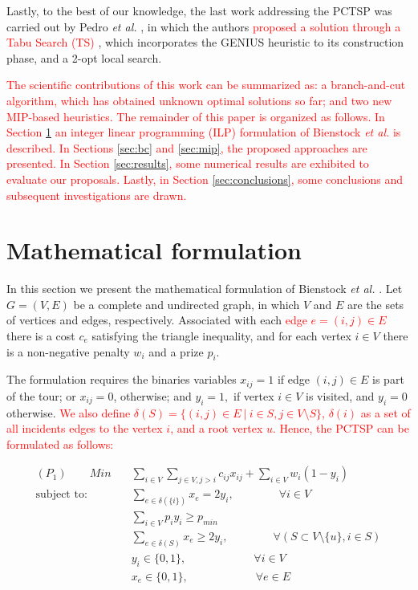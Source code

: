 \documentclass{ro}
\begin{document}
Lastly, to the best of our knowledge, the last work addressing the PCTSP was carried out by Pedro \textit{et al.} \cite{pedro2013tabu}, in which the authors \textcolor{red}{proposed a solution through a Tabu Search (TS) \cite{laguna2018tabu}}, which incorporates the GENIUS \cite{genius} heuristic to its construction phase, and a 2-opt local search.

\textcolor{red}{
The  scientific contributions of this work can be summarized as: a branch-and-cut algorithm, which has obtained unknown optimal solutions so far; and two new MIP-based heuristics. The remainder of this paper is organized as follows. In Section \ref{sec:mf} an integer linear programming (ILP) formulation of Bienstock \textit{et al.}\cite{bienstock1993note} is described. In Sections \ref{sec:bc} and \ref{sec:mip}, the proposed approaches are presented. In Section \ref{sec:results}, some numerical results are exhibited to evaluate our proposals. Lastly, in Section \ref{sec:conclusions}, some conclusions and subsequent investigations are drawn.
}

\section{Mathematical formulation}
\label{sec:mf}




In this section we present the mathematical formulation of Bienstock \textit{et al.} \cite{bienstock1993note}. 
Let $G = (V, E)$ be a complete and undirected graph, in which $V$ and $E$ are the sets of vertices and edges, respectively. Associated with each \textcolor{red}{edge $e = (i, j) \in E$} there is a cost $c_e$ satisfying the triangle inequality, and for each vertex $i \in V$ there is a non-negative penalty $w_i$ and a prize $p_i$.

 The formulation requires the binaries variables $x_{ij}=1$ if edge $(i, j) \in E $
is part of the tour; or $x_{ij}=0$, otherwise; and  $y_i =  1,$ if vertex  $i \in V$ is visited, and $y_i=0$  otherwise. \textcolor{red}{We also define $\delta(S) = \{ (i,j) \in E \ | \ i \in S, j \in V \setminus S \}$, $\delta(i)$ as a set of all incidents edges to the vertex $i$, and a root vertex $u$. Hence, the PCTSP can be formulated as follows:}

	\begin{align}
(P_1) \qquad	Min \quad  &\sum_{i \in V} \sum_{j \in V, j > i} c_{ij}x_{ij} + \sum_{i \in V} w_i (1 - y_i)  \label{naodir1}\\
	\text{subject to:}
	&\sum_{e \in \delta(\{i\})} x_e = 2 y_i,  \qquad \qquad \forall i \in V\label{naodir2}\\
	&\sum_{i \in V}p_iy_i \geq p_{min} \label{naodir3}\\
	&\sum_{e \in \delta(S)} x_e \geq 2 y_i, \qquad  \qquad \forall (S \subset V \setminus \{u\}, i \in S) \label{naodir4}\\
	&y_i \in \{0,1\}, \qquad \qquad \qquad \forall i \in V \label{naodir5}\\
	&x_e \in \{0,1\}, \qquad \qquad \qquad \forall e \in E \label{naodir6} 
	\end{align}
\end{document}

